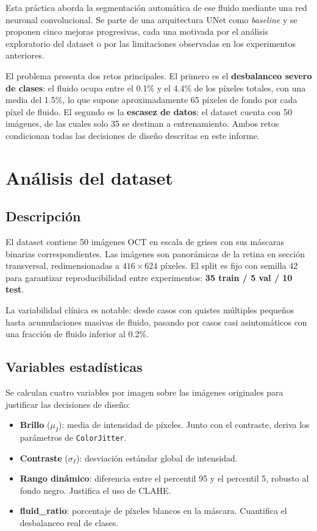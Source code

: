 \documentclass[12pt,a4paper]{article}
\begin{document}
Esta práctica aborda la segmentación automática de ese fluido mediante una red neuronal convolucional. Se parte de una arquitectura UNet como \textit{baseline} y se proponen cinco mejoras progresivas, cada una motivada por el análisis exploratorio del dataset o por las limitaciones observadas en los experimentos anteriores.

El problema presenta dos retos principales. El primero es el \textbf{desbalanceo severo de clases}: el fluido ocupa entre el 0.1\% y el 4.4\% de los píxeles totales, con una media del 1.5\%, lo que supone aproximadamente 65 píxeles de fondo por cada píxel de fluido. El segundo es la \textbf{escasez de datos}: el dataset cuenta con 50 imágenes, de las cuales solo 35 se destinan a entrenamiento. Ambos retos condicionan todas las decisiones de diseño descritas en este informe.

\section{Análisis del dataset}

\subsection{Descripción}

El dataset contiene 50 imágenes OCT en escala de grises con sus máscaras binarias correspondientes. Las imágenes son panorámicas de la retina en sección transversal, redimensionadas a $416 \times 624$ píxeles. El split es fijo con semilla 42 para garantizar reproducibilidad entre experimentos: \textbf{35 train / 5 val / 10 test}.

La variabilidad clínica es notable: desde casos con quistes múltiples pequeños hasta acumulaciones masivas de fluido, pasando por casos casi asintomáticos con una fracción de fluido inferior al 0.2\%.

\subsection{Variables estadísticas}

Se calculan cuatro variables por imagen sobre las imágenes originales para justificar las decisiones de diseño:

\begin{itemize}
    \item \textbf{Brillo} ($\mu_I$): media de intensidad de píxeles. Junto con el contraste, deriva los parámetros de \texttt{ColorJitter}.
    \item \textbf{Contraste} ($\sigma_I$): desviación estándar global de intensidad.
    \item \textbf{Rango dinámico}: diferencia entre el percentil 95 y el percentil 5, robusto al fondo negro. Justifica el uso de CLAHE.
    \item \textbf{fluid\_ratio}: porcentaje de píxeles blancos en la máscara. Cuantifica el desbalanceo real de clases.
\end{itemize}
\end{document}
